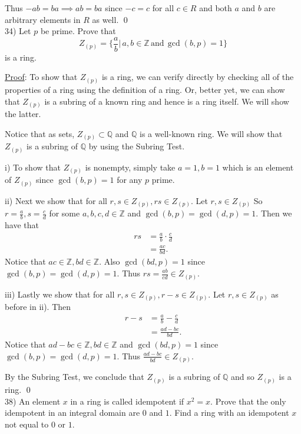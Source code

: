 \documentclass{article}
\begin{document}
Thus $-ab = ba \implies ab = ba$ since $-c = c$ for all $c \in R$ and both $a$ and $b$ are arbitrary elements in $R$ as well. \qed \\

34) Let $p$ be prime. Prove that
$$Z_{(p)} = \big\{ \frac{a}{b} \big\vert \, a, b \in \mathbb{Z} \, \text{and} \, \gcd(b, p) = 1 \big\} $$
is a ring. 

\underline{Proof}: To show that $Z_{(p)}$ is a ring, we can verify directly by checking all of the properties of a ring using the definition of a ring. Or, better yet, we can show that $Z_{(p)}$ is a subring of a known ring and hence is a ring itself. We will show the latter.

Notice that as sets, $Z_{(p)} \subset \mathbb{Q}$ and $\mathbb{Q}$ is a well-known ring. We will show that $Z_{(p)}$ is a subring of $\mathbb{Q}$ by using the Subring Test.

i) To show that $Z_{(p)}$ is nonempty, simply take $a = 1, b = 1$ which is an element of $Z_{(p)}$ since $\gcd(b, p) = 1$ for any $p$ prime.

ii) Next we show that for all $r, s \in Z_{(p)}, rs \in Z_{(p)}$. Let $r, s \in Z_{(p)}$ So $r = \frac ab, s = \frac cd$ for some $a, b, c, d \in \mathbb{Z}$ and $\gcd(b, p) = \gcd(d, p) = 1$. Then we have that
\begin{align*}
	rs &= \frac ab \cdot \frac cd \\
	&= \frac{ac}{bd}.
\end{align*}
Notice that $ac \in \mathbb{Z}, bd \in \mathbb{Z}$. Also $\gcd(bd, p) = 1$ since $\gcd(b, p) = \gcd(d, p) = 1$. Thus $rs = \frac{ab}{cd} \in Z_{(p)}$.

iii) Lastly we show that for all $r, s \in Z_{(p)}, r - s \in Z_{(p)}$. Let $r, s \in Z_{(p)}$ as before in ii). Then 
\begin{align*}
	r - s &= \frac ab - \frac cd \\
	&= \frac{ad-bc}{bd}.
\end{align*}
Notice that $ad - bc \in \mathbb{Z}, bd \in \mathbb{Z}$ and $\gcd(bd, p) = 1$ since $\gcd(b, p) = \gcd(d, p) = 1$. Thus $\frac{ad-bc}{bd} \in Z_{(p)}.$

By the Subring Test, we conclude that $Z_{(p)}$ is a subring of $\mathbb{Q}$ and so $Z_{(p)}$ is a ring. \qed \\

38) An element $x$ in a ring is called idempotent if $x^2 = x$. Prove that the only idempotent in an integral domain are $0$ and $1$. Find a ring with an idempotent $x$ not equal to $0$ or $1$. 
\end{document}
